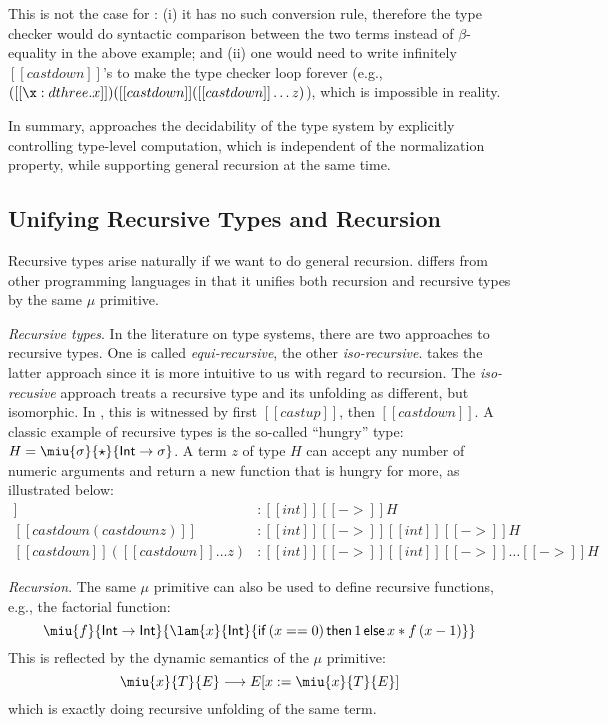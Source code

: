 This is not the case for \name: (i) it has no such conversion rule, therefore the type checker would do syntactic comparison between the two terms instead of $\beta$-equality in the above example; and (ii) one would need to write infinitely $[[castdown]]$'s to make the type checker loop forever (e.g., $([[\x:d three.x]])([[castdown]]([[castdown]] \dots z) $), which is impossible in reality.

In summary, \name approaches the decidability of the type system by explicitly controlling type-level computation, which is independent of the normalization property, while supporting general recursion at the same time.

\subsection{Unifying Recursive Types and Recursion}


Recursive types arise naturally if we want to do general recursion. \name differs from other programming languages in that it unifies both recursion and recursive types by the same $\mu$ primitive.

\emph{Recursive types}. In the literature on type systems, there are two approaches to recursive types. One is called \emph{equi-recursive}, the other \emph{iso-recursive}. \name takes the latter approach since it is more intuitive to us with regard to recursion. The \emph{iso-recusive} approach treats a recursive type and its unfolding as different, but isomorphic. In \name, this is witnessed by first $[[castup]]$, then $[[castdown]]$. A classic example of recursive types is the so-called ``hungry'' type: $H = \miu{\sigma}{\star}{\mathsf{Int} \rightarrow \sigma}$. A term $z$ of type $H$ can accept any number of numeric arguments and return a new function that is hungry for more, as illustrated below:
\begin{align*}
[[castdown z]] &: [[int]][[->]]H  \\
[[castdown(castdown z)]] &: [[int]][[->]][[int]][[->]]H \\
[[castdown]]([[castdown]] \dots z) &: [[int]][[->]][[int]][[->]]\dots[[->]]H
\end{align*}

\emph{Recursion}. The same $\mu$ primitive can also be used to define recursive functions, e.g., the factorial function: \[\miu{f}{\mathsf{Int} \rightarrow \mathsf{Int}}{\lam{x}{\mathsf{Int}}{\mathsf{if}\,(x == 0)\,\mathsf{then}\,1\,\mathsf{else}\,x * f\,(x - 1)}}\] This is reflected by the dynamic semantics of the $\mu$ primitive: 
\[\miu{x}{T}{E} \longrightarrow E[x:=\miu{x}{T}{E}]\]
which is exactly doing recursive unfolding of the same term.


